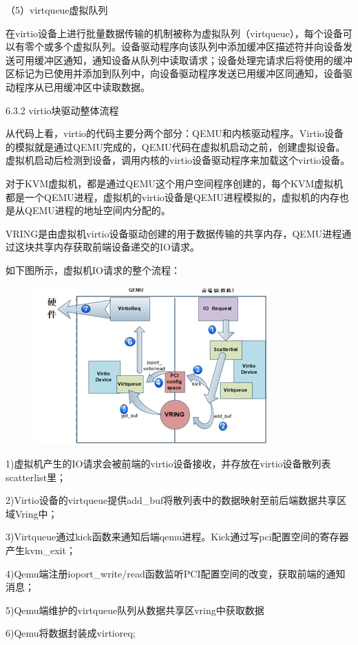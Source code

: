 （5）virtqueue虚拟队列

在virtio设备上进行批量数据传输的机制被称为虚拟队列（virtqueue），每个设备可以有零个或多个虚拟队列。设备驱动程序向该队列中添加缓冲区描述符并向设备发送可用缓冲区通知，通知设备从队列中读取请求；设备处理完请求后将使用的缓冲区标记为已使用并添加到队列中，向设备驱动程序发送已用缓冲区同通知，设备驱动程序从已用缓冲区中读取数据。

6.3.2 virtio块驱动整体流程

从代码上看，virtio的代码主要分两个部分：QEMU和内核驱动程序。Virtio设备的模拟就是通过QEMU完成的，QEMU代码在虚拟机启动之前，创建虚拟设备。虚拟机启动后检测到设备，调用内核的virtio设备驱动程序来加载这个virtio设备。

对于KVM虚拟机，都是通过QEMU这个用户空间程序创建的，每个KVM虚拟机都是一个QEMU进程，虚拟机的virtio设备是QEMU进程模拟的，虚拟机的内存也是从QEMU进程的地址空间内分配的。

VRING是由虚拟机virtio设备驱动创建的用于数据传输的共享内存，QEMU进程通过这块共享内存获取前端设备递交的IO请求。

如下图所示，虚拟机IO请求的整个流程：

\begin{figure}[H]
    \centering
    \includegraphics{figures/06-03-2.png}
\end{figure}
1)虚拟机产生的IO请求会被前端的virtio设备接收，并存放在virtio设备散列表scatterlist里；

2)Virtio设备的virtqueue提供add_buf将散列表中的数据映射至前后端数据共享区域Vring中；

3)Virtqueue通过kick函数来通知后端qemu进程。Kick通过写pci配置空间的寄存器产生kvm_exit；

4)Qemu端注册ioport_write/read函数监听PCI配置空间的改变，获取前端的通知消息；

5)Qemu端维护的virtqueue队列从数据共享区vring中获取数据

6)Qemu将数据封装成virtioreq;

